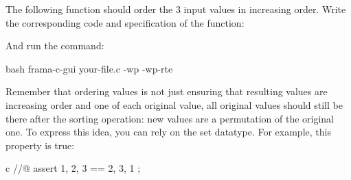 


The following function should order the 3 input values in increasing order.
Write the corresponding code and specification of the function:




And run the command:


\begin{CodeBlock}{bash}
frama-c-gui your-file.c -wp -wp-rte
\end{CodeBlock}


Remember that ordering values is not just ensuring that resulting values
are increasing order and one of each original value, all original values
should still be there after the sorting operation: new values are a
permutation of the original one. To express this idea, you can rely on the
set datatype. For example, this property is true:

\begin{CodeBlock}{c}
//@ assert { 1, 2, 3 } == { 2, 3, 1 };
\end{CodeBlock}
